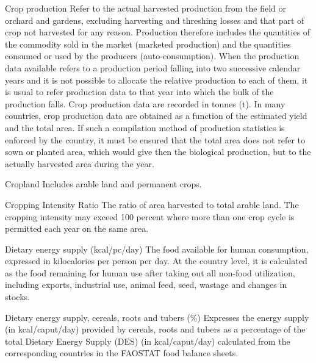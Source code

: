 \begin{MetadataCollection} {}
\begin{metadata}{Crop production} {}
Refer to the actual harvested production from the field or orchard and gardens, excluding harvesting and threshing losses and that part of crop not harvested for any reason. Production therefore includes the quantities of the commodity sold in the market (marketed production) and the quantities consumed or used by the producers (auto-consumption). When the production data available refers to a production period falling into two successive calendar years and it is not possible to allocate the relative production to each of them, it is usual to refer production data to that year into which the bulk of the production falls. Crop production data are recorded in tonnes (t). In many countries, crop production data are obtained as a function of the estimated yield and the total area. If such a compilation method of production statistics is enforced by the country, it must be ensured that the total area does not refer to sown or planted area, which would give then the biological production, but to the actually harvested area during the year.
\end{metadata}

\begin{metadata}{Cropland} {}
Includes arable land and permanent crops.
\end{metadata}

\begin{metadata}{Cropping Intensity Ratio} {}
The ratio of area harvested to total arable land. The cropping intensity may exceed 100 percent where more than one crop cycle is permitted each year on the same area.
\end{metadata}

\begin{metadata}{Dietary energy supply (kcal/pc/day)} {}
The food available for human consumption, expressed in kilocalories per person per day. At the country level, it is calculated as the food remaining for human use after taking out all non-food utilization, including exports, industrial use, animal feed, seed, wastage and changes in stocks.
\end{metadata}

\begin{metadata}{Dietary energy supply, cereals, roots and tubers (\%)} {}
Expresses the energy supply (in kcal/caput/day) provided by cereals, roots and tubers as a percentage of the total Dietary Energy Supply (DES) (in kcal/caput/day) calculated from the corresponding countries in the FAOSTAT food balance sheets.
\end{metadata}


\end{MetadataCollection}
